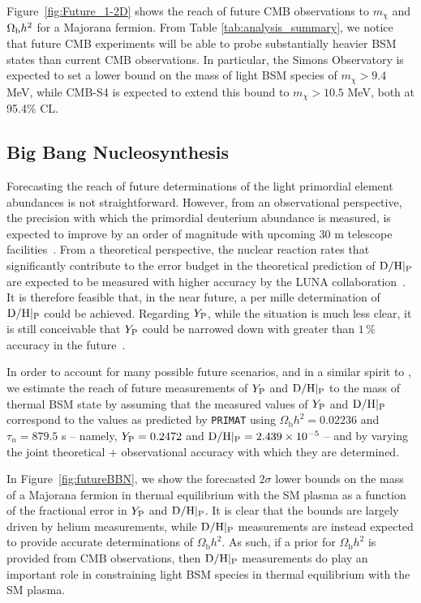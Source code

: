Figure~\ref{fig:Future_1-2D} shows the reach of future CMB observations to $m_\chi$ and $\Omega_{\rm b}h^2$ for a Majorana fermion. From Table \ref{tab:analysis_summary}, we notice that future CMB experiments will be able to probe substantially heavier BSM states than current CMB observations. In particular, the Simons Observatory is expected to set a lower bound on the mass of light BSM species of $m_\chi > 9.4$ MeV, while CMB-S4 is expected to extend this bound to $m_\chi > 10.5$ MeV, both at 95.4\% CL.


\subsection{Big Bang Nucleosynthesis}\label{sec:future_BBN}

Forecasting the reach of future determinations of the light primordial element abundances is not straightforward. However, from an observational perspective, the precision with which the primordial deuterium abundance is measured, is expected to improve by an order of magnitude with upcoming 30 m telescope facilities~\cite{Cooke:2016rky,Grohs:2019cae}. From a theoretical perspective, the nuclear reaction rates that significantly contribute to the error budget in the theoretical prediction of ${\rm D/H}|_{\rm P}$ are expected to be measured with higher accuracy by the LUNA collaboration~\cite{Trezzi:2018qjs}. It is therefore feasible that, in the near future, a per mille determination of ${\rm D/H}|_{\rm P}$ could be achieved. Regarding $Y_{\rm P}$, while the situation is much less clear, it is still conceivable that $Y_{\rm P}$ could be narrowed down with greater than $1\,\%$ accuracy in the future~\cite{Grohs:2019cae}.

In order to account for many possible future scenarios, and in a similar spirit to \cite{Lague:2019yvs}, we estimate the reach of future measurements of $Y_{\rm P}$ and ${\rm D/H}|_{\rm P}$ to the mass of thermal BSM state by assuming that the measured values of $Y_{\rm P}$ and ${\rm D/H}|_{\rm P}$ correspond to the values as predicted by \texttt{PRIMAT} using $\Omega_{\mathrm{b}} h^2 = 0.02236$ and $\tau_n = 879.5$ s -- namely, $Y_{\rm P} = 0.2472$ and ${\rm D/H}|_{\rm P} = 2.439 \times 10^{-5}$ -- and by varying the joint theoretical + observational accuracy with which they are determined.

In Figure~\ref{fig:futureBBN}, we show the forecasted $2\sigma$ lower bounds on the mass of a Majorana fermion in thermal equilibrium with the SM plasma as a function of the fractional error in $Y_{\rm P}$ and ${\rm D/H}|_{\rm P}$. It is clear that the bounds are largely driven by helium measurements, while ${\rm D/H}|_{\rm P}$ measurements are instead expected to provide accurate determinations of $\Omega_{\mathrm{b}}h^2$. As such, if a prior for $\Omega_{\mathrm{b}}h^2$ is provided from CMB observations, then ${\rm D/H}|_{\rm P}$ measurements do play an important role in constraining light BSM species in thermal equilibrium with the SM plasma. 
\clearpage
 
